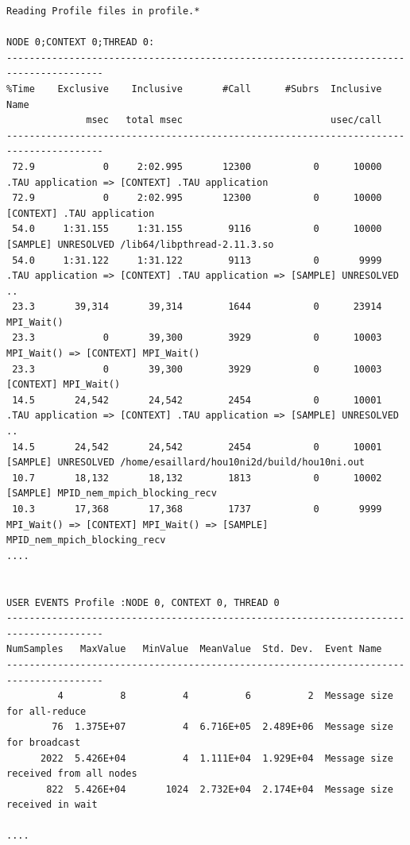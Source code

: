 \documentclass[10pt,twoside]{article}   	%
\begin{document}
{\scriptsize
\begin{verbatim}
Reading Profile files in profile.*

NODE 0;CONTEXT 0;THREAD 0:
---------------------------------------------------------------------------------------
%Time    Exclusive    Inclusive       #Call      #Subrs  Inclusive Name
              msec   total msec                          usec/call
---------------------------------------------------------------------------------------
 72.9            0     2:02.995       12300           0      10000 .TAU application => [CONTEXT] .TAU application
 72.9            0     2:02.995       12300           0      10000 [CONTEXT] .TAU application
 54.0     1:31.155     1:31.155        9116           0      10000 [SAMPLE] UNRESOLVED /lib64/libpthread-2.11.3.so
 54.0     1:31.122     1:31.122        9113           0       9999 .TAU application => [CONTEXT] .TAU application => [SAMPLE] UNRESOLVED ..
 23.3       39,314       39,314        1644           0      23914 MPI_Wait()
 23.3            0       39,300        3929           0      10003 MPI_Wait() => [CONTEXT] MPI_Wait()
 23.3            0       39,300        3929           0      10003 [CONTEXT] MPI_Wait()
 14.5       24,542       24,542        2454           0      10001 .TAU application => [CONTEXT] .TAU application => [SAMPLE] UNRESOLVED ..
 14.5       24,542       24,542        2454           0      10001 [SAMPLE] UNRESOLVED /home/esaillard/hou10ni2d/build/hou10ni.out
 10.7       18,132       18,132        1813           0      10002 [SAMPLE] MPID_nem_mpich_blocking_recv
 10.3       17,368       17,368        1737           0       9999 MPI_Wait() => [CONTEXT] MPI_Wait() => [SAMPLE] MPID_nem_mpich_blocking_recv
....


USER EVENTS Profile :NODE 0, CONTEXT 0, THREAD 0
---------------------------------------------------------------------------------------
NumSamples   MaxValue   MinValue  MeanValue  Std. Dev.  Event Name
---------------------------------------------------------------------------------------
         4          8          4          6          2  Message size for all-reduce
        76  1.375E+07          4  6.716E+05  2.489E+06  Message size for broadcast
      2022  5.426E+04          4  1.111E+04  1.929E+04  Message size received from all nodes
       822  5.426E+04       1024  2.732E+04  2.174E+04  Message size received in wait

....


\end{verbatim}}
\end{document}
